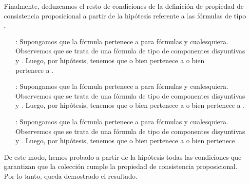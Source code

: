 \begin{isabellebody}
\begin{isamarkuptext}
\begin{demostracion}
  Finalmente, deduzcamos el resto de condiciones de la definición de propiedad de consistencia
  proposicional a partir de la hipótesis referente a las fórmulas de tipo \isa{{\isasymbeta}}.
  \begin{enumerate}
    \item[\isa{{\isadigit{4}}{\isacharparenright}}:] Supongamos que la fórmula  pertenece a  para fórmulas  y 
    cualesquiera. Observemos que se trata de una fórmula de tipo \isa{{\isasymbeta}} de componentes disyuntivas
     y . Luego, por hipótesis, tenemos que o bien  pertenece a  o bien\\
     pertenece a .
    \item[\isa{{\isadigit{5}}{\isacharparenright}}:] Supongamos que la fórmula  pertenece a  para fórmulas  y 
    cualesquiera. Observemos que se trata de una fórmula de tipo \isa{{\isasymbeta}} de componentes disyuntivas
     y . Luego, por hipótesis, tenemos que o bien  pertenece a  o
    bien  pertenece a .
    \item[\isa{{\isadigit{7}}{\isacharparenright}}:] Supongamos que la fórmula  pertenece a  para fórmulas  y 
    cualesquiera. Observemos que se trata de una fórmula de tipo \isa{{\isasymbeta}} de componentes disyuntivas
     y . Luego, por hipótesis, tenemos que o bien  pertenece a  o
    bien  pertenece .
  \end{enumerate} 

  De este modo, hemos probado a partir de la hipótesis todas las condiciones que garantizan que la
  colección  cumple la propiedad de consistencia proposicional. Por lo tanto, queda demostrado el
  resultado.
\end{demostracion}


\end{isamarkuptext}
\end{isabellebody}
